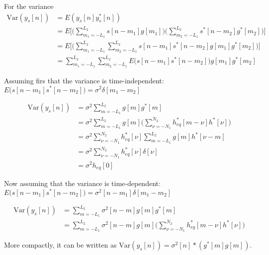 \documentclass[a4paper]{article}
\begin{document}
For the variance
\begin{align}
\text{Var}(y_s[n]) &= E(y_s[n]y_s^*[n])\\
& = E\bigg[\bigg(\sum_{m_1=-L_1}^{L_2} s[n-m_1]g[m_1]\bigg)\bigg(\sum_{m_2=-L_1}^{L_2} s^*[n-m_2]g^*[m_2]\bigg)\bigg] \\
& = E\bigg[\bigg(\sum_{m_1=-L_1}^{L_2}\sum_{m_2=-L_1}^{L_2}  s[n-m_1]s^*[n-m_2]g[m_1]g^*[m_2]\bigg)\bigg] \\
& = \sum_{m_1=-L_1}^{L_2}\sum_{m_2=-L_1}^{L_2}  E\Big(s[n-m_1]s^*[n-m_2]\Big)g[m_1]g^*[m_2]
\end{align}

Assuming firs that the variance is time-independent: $E\Big(s[n-m_1]s^*[n-m_2]\Big) = \sigma^2\delta[m_1-m_2]$

\begin{align}
\text{Var}(y_s[n]) & = \sigma^2\sum_{m=-L_1}^{L_2} g[m]g^*[m] \\
& = \sigma^2\sum_{m=-L_1}^{L_2} g[m]\bigg(\sum_{\nu= -N_1}^{N_2} h^*_{eq}[m-\nu]h^*[\nu]\bigg) \\
& = \sigma^2\sum_{\nu= -N_1}^{N_2} h^*_{eq}[\nu] \sum_{m=-L_1}^{L_2} g[m]h^*[\nu-m] \\
& = \sigma^2\sum_{\nu= -N_1}^{N_2} h^*_{eq}[\nu]\delta[\nu] \\
& = \sigma^2h_{eq}[0]
\end{align}

Now assuming that the variance is time-dependent: $E\Big(s[n-m_1]s^*[n-m_2]\Big) = \sigma^2[n-m_1]\delta[m_1-m_2]$

\begin{align}
\text{Var}(y_s[n]) & = \sum_{m=-L_1}^{L_2} \sigma^2[n-m]g[m]g^*[m] \\
& = \sum_{m=-L_1}^{L_2}  \sigma^2[n-m]g[m]\bigg(\sum_{\nu= -N_1}^{N_2} h^*_{eq}[m-\nu]h^*[\nu]\bigg)
\end{align}

More compactly, it can be written as $\text{Var}(y_s[n]) = \sigma^2[n]\ast (g^*[m]g[m])$.
\end{document}
